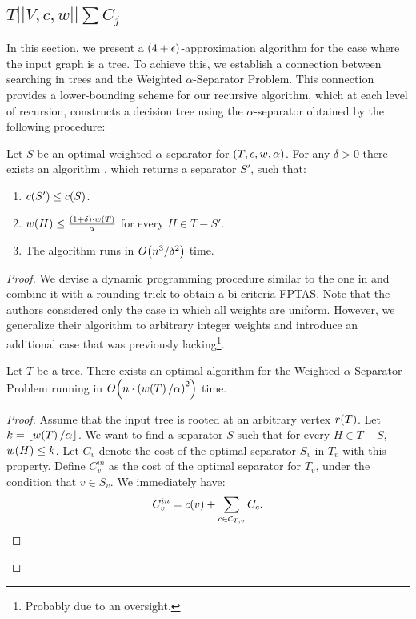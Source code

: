 \subsection{$T||V,c,w||\sum C_j$}\label{serachingInTs}

In this section, we present a $\mathopen{}\left( 4+\epsilon \right)$-approximation algorithm 
for the case where the input graph is a tree. 
To achieve this, we establish a connection between searching in trees and 
the Weighted $\alpha$-Separator Problem. 
This connection provides a lower-bounding scheme for our recursive algorithm, 
which at each level of recursion, constructs a decision tree using the 
$\alpha$-separator obtained by the following procedure:

\begin{theorem}\label{bicriteriaFPTAS}
    Let $S$ be an optimal weighted $\alpha$-separator for $\mathopen{}\left( T,c,w,\alpha \right)$. For any $\delta>0$ there exists an algorithm \FSeparatorFPTAS, which returns a separator $S'$, such that:
    \begin{enumerate}
        \item $c\mathopen{}\left( S' \right)\leq c\mathopen{}\left( S \right)$.
        \item $w\mathopen{}\left( H \right)\leq \frac{\mathopen{}\left( 1+\delta \right)\cdot w\mathopen{}\left( T \right)}{\alpha}$ for every $H\in T-S'$.
        \item The algorithm runs in $O\mathopen{}\left( n^3/\delta^2 \right)$ time.
    \end{enumerate}
\begin{proof}
We devise a dynamic programming procedure similar to the one in \cite{kseparator} and combine it with a rounding trick to obtain a bi-criteria FPTAS.
Note that the authors considered only the case in which all weights are uniform. However, we generalize their algorithm to arbitrary integer weights and introduce an additional case that 
was previously lacking\footnote{Probably due to an oversight.}.

\begin{theorem}\label{separator}
    Let $T$ be a tree. 
    There exists an optimal algorithm for the Weighted $\alpha$-Separator Problem running in 
    $O\mathopen{}\left( n\cdot \mathopen{}\left( w\mathopen{}\left( T \right)/\alpha \right)^2 \right)$ time.

\begin{proof}
    Assume that the input tree is rooted at an arbitrary vertex $r\mathopen{}\left( T \right)$. Let $k=\mathopen{}\left\lfloor w\mathopen{}\left( T \right)/\alpha \right\rfloor$. We want to find a separator $S$ such that for every $H\in T-S$, $w\mathopen{}\left( H \right)\leq k$.
    Let $C_{v}$ denote the cost of the optimal separator $S_v$ in $T_v$ with this property. 
    Define $C_{v}^{in}$ as the cost of the optimal separator for $T_v$, 
    under the condition that $v \in S_v$. 
    We immediately have:
    $$
    C_{v}^{in} = c\mathopen{}\left( v \right)+\sum_{c\in \mathcal{C}_{T,v}}C_{c}.
    $$
    

\end{proof}
\end{theorem}
\end{proof}
\end{theorem}
